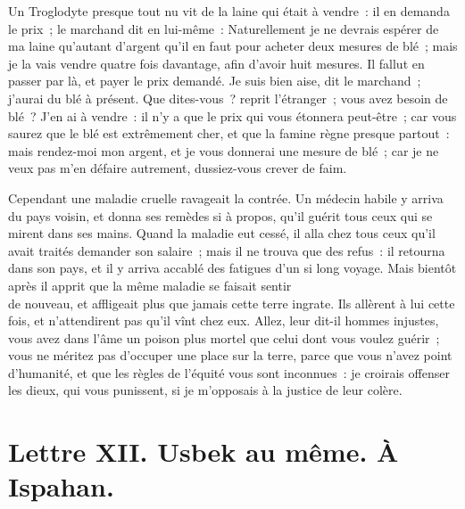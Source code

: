 \documentclass[french,twoside]{book} %
\newcommand{\dateline}[1]{\medskip{\RaggedLeft{#1}\par}\bigskip}
\begin{document}
Un Troglodyte presque tout nu vit de la laine qui était à vendre : il en demanda le prix ; le marchand dit en lui-même : Naturellement je ne devrais espérer de ma laine qu’autant d’argent qu’il en faut pour acheter deux mesures de blé ; mais je la vais vendre quatre fois davantage, afin d’avoir huit mesures. Il fallut en passer par là, et payer le prix demandé. Je suis bien aise, dit le marchand ; j’aurai du blé à présent. Que dites-vous ? reprit l’étranger ; vous avez besoin de blé ? J’en ai à vendre : il n’y a que le prix qui vous étonnera peut-être ; car vous saurez que le blé est extrêmement cher, et que la famine règne presque partout : mais rendez-moi mon argent, et je vous donnerai une mesure de blé ; car je ne veux pas m’en défaire autrement, dussiez-vous crever de faim.\par
Cependant une maladie cruelle ravageait la contrée. Un médecin habile y arriva du pays voisin, et donna ses remèdes si à propos, qu’il guérit tous ceux qui se mirent dans ses mains. Quand la maladie eut cessé, il alla chez tous ceux qu’il avait traités demander son salaire ; mais il ne trouva que des refus : il retourna dans son pays, et il y arriva accablé des fatigues d’un si long voyage. Mais bientôt après il apprit que la même maladie se faisait sentir \\
de nouveau, et affligeait plus que jamais cette terre ingrate. Ils allèrent à lui cette fois, et n’attendirent pas qu’il vînt chez eux. Allez, leur dit-il hommes injustes, vous avez dans l’âme un poison plus mortel que celui dont vous voulez guérir ; vous ne méritez pas d’occuper une place sur la terre, parce que vous n’avez point d’humanité, et que les règles de l’équité vous sont inconnues : je croirais offenser les dieux, qui vous punissent, si je m’opposais à la justice de leur colère.\par

\dateline{À Erzeron, le 3 de la lune de Gemmadi 2, 1711.}
\section[{Lettre XII. Usbek au même. À Ispahan.}]{Lettre XII. Usbek au même. À Ispahan.}\renewcommand{\leftmark}{Lettre XII. Usbek au même. À Ispahan.}
\end{document}
